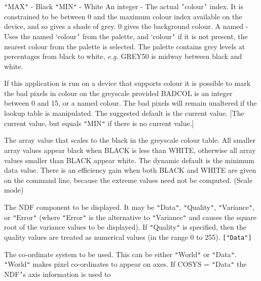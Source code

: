 \documentclass[twoside,11pt]{article}
\newcommand{\sstsubsection}[1]{ \item[{#1}] \mbox{} \\}
\renewcommand{\sstsubsection}[1]{\item[{#1}]}
\begin{document}
{{{           {\tt "}MAX{\tt "}       - Black
           {\tt "}MIN{\tt "}       - White
           An integer  - The actual {\tt '}colour{\tt '} index.  It is constrained
                         to be between 0 and the maximum colour index
                         available on the device, and so gives a shade
                         of grey.  0 gives the background colour.
           A named     - Uses the named `colour{\tt '} from the palette, and
           `colour{\tt '}      if it is not present, the nearest colour from
                         the palette is selected.  The palette contains
                         grey levels at percentages from black to white,
                         \emph{e.g.} GREY50 is midway between black and white.

         If this application is run on a device that supports colour
         it is possible to mark the bad pixels in colour on the
         greyscale provided BADCOL is an integer between 0 and 15, or
         a named colour.  The bad pixels will remain unaltered if the
         lookup table is manipulated.  The suggested default is the
         current value. [The current value, but equals {\tt "}MIN{\tt "} if there
         is no current value.]
      }
      \sstsubsection{
         BLACK = \_DOUBLE (Read)
      }{
         The array value that scales to the black in the greyscale
         colour table.  All smaller array values appear black when
         BLACK is less than WHITE, otherwise all array values
         smaller than BLACK appear white.  The dynamic default is the
         minimum data value.   There is an efficiency gain when both
         BLACK and WHITE are given on the command line, because the
         extreme values need not be computed.  (Scale mode)
      }
      \sstsubsection{
         COMP = LITERAL (Read)
      }{
         The NDF component to be displayed.  It may be {\tt "}Data{\tt "},
         {\tt "}Quality{\tt "}, {\tt "}Variance{\tt "}, or {\tt "}Error{\tt "} (where {\tt "}Error{\tt "} is the
         alternative to {\tt "}Variance{\tt "} and causes the square root of the
         variance values to be displayed).  If {\tt "}Quality{\tt "} is specified,
         then the quality values are treated as numerical values (in
         the range 0 to 255). {\tt [{\tt "}Data{\tt "}]}
      }
      \sstsubsection{
         COSYS = LITERAL (Read)
      }{
         The co-ordinate system to be used.  This can be either {\tt "}World{\tt "}
         or {\tt "}Data{\tt "}.  {\tt "}World{\tt "} makes pixel co-ordinates to appear on axes.
         If COSYS = {\tt "}Data{\tt "} the NDF{\tt '}s axis information is used to
}}}
\end{document}
